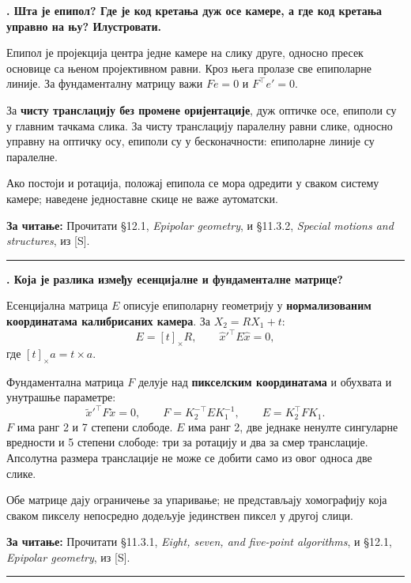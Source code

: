\documentclass[10pt,a4paper]{article}
\newcommand{\en}[1]{\textit{#1}}
\newcounter{pitanje}
\newenvironment{odgovor}[1]{\stepcounter{pitanje}\begin{minipage}[t][0.455\textheight][t]{\textwidth}\vspace{0pt}\textbf{\thepitanje. #1}\par\smallskip}{\end{minipage}\par\ifodd\value{pitanje}\vspace{0.025\textheight}\hrule\vspace{0.015\textheight}\else\newpage\fi}
\newcommand{\izvor}[1]{\par\vfill{\footnotesize\textbf{За читање:} #1}\par}
\begin{document}
\begin{odgovor}{Шта је епипол? Где је код кретања дуж осе камере, а где код кретања управно на њу? Илустровати.}
Епипол је пројекција центра једне камере на слику друге, односно пресек основице са њеном пројективном равни. Кроз њега пролазе све епиполарне линије. За фундаменталну матрицу важи $Fe=0$ и $F^\top e'=0$.

За \textbf{чисту транслацију без промене оријентације}, дуж оптичке осе, епиполи су у главним тачкама слика. За чисту транслацију паралелну равни слике, односно управну на оптичку осу, епиполи су у бесконачности: епиполарне линије су паралелне.
\begin{center}\end{center}
Ако постоји и ротација, положај епипола се мора одредити у сваком систему камере; наведене једноставне скице не важе аутоматски.
\izvor{Прочитати §12.1, \en{Epipolar geometry}, и §11.3.2, \en{Special motions and structures}, из [S].}
\end{odgovor}

\begin{odgovor}{Која је разлика између есенцијалне и фундаменталне матрице?}
Есенцијална матрица $E$ описује епиполарну геометрију у \textbf{нормализованим координатама калибрисаних камера}. За $X_2=RX_1+t$:
\[
E=[t]_\times R,\qquad \widehat x'^\top E\widehat x=0,
\]
где $[t]_\times a=t\times a$.

Фундаментална матрица $F$ делује над \textbf{пикселским координатама} и обухвата и унутрашње параметре:
\[
\widetilde x'^\top F\widetilde x=0,\qquad
F=K_2^{-\top}EK_1^{-1},\qquad E=K_2^\top FK_1.
\]
$F$ има ранг 2 и 7 степени слободе. $E$ има ранг 2, две једнаке ненулте сингуларне вредности и 5 степени слободе: три за ротацију и два за смер транслације. Апсолутна размера транслације не може се добити само из овог односа две слике.

Обе матрице дају ограничење за упаривање; не представљају хомографију која сваком пикселу непосредно додељује јединствен пиксел у другој слици.
\izvor{Прочитати §11.3.1, \en{Eight, seven, and five-point algorithms}, и §12.1, \en{Epipolar geometry}, из [S].}
\end{odgovor}
\end{document}
